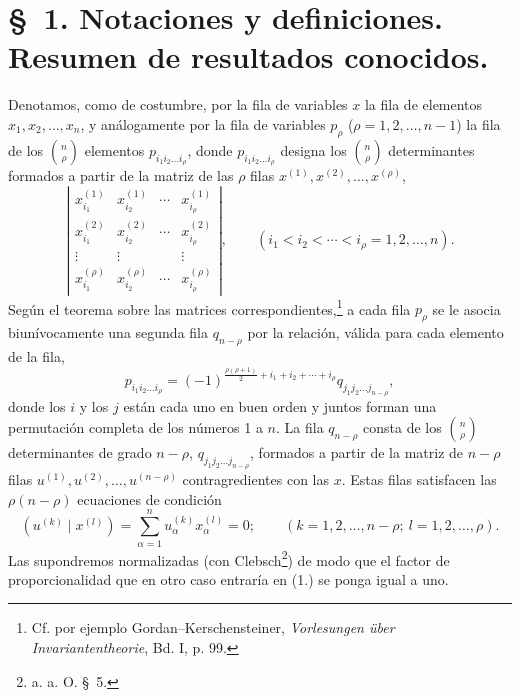 \documentclass[11pt]{article}
\begin{document}
\section*{\S\ 1. Notaciones y definiciones. Resumen de resultados conocidos.}
Denotamos, como de costumbre, por la fila de variables $x$ la fila de elementos $x_1,x_2,\ldots,x_n$, y análogamente por la fila de variables $p_\rho$ ($\rho=1,2,\ldots,n-1$) la fila de los $\binom n\rho$ elementos $p_{i_1i_2\ldots i_\rho}$, donde $p_{i_1i_2\ldots i_\rho}$ designa los $\binom n\rho$ determinantes formados a partir de la matriz de las $\rho$ filas $x^{(1)},x^{(2)},\ldots,x^{(\rho)}$,
\[
\left|\begin{array}{cccc}
 x_{i_1}^{(1)}&x_{i_2}^{(1)}&\cdots&x_{i_\rho}^{(1)}\\
 x_{i_1}^{(2)}&x_{i_2}^{(2)}&\cdots&x_{i_\rho}^{(2)}\\
 \vdots&\vdots&&\vdots\\
 x_{i_1}^{(\rho)}&x_{i_2}^{(\rho)}&\cdots&x_{i_\rho}^{(\rho)}
\end{array}\right|,
\qquad (i_1<i_2<\cdots<i_\rho=1,2,\ldots,n).
\]
Según el teorema sobre las matrices correspondientes,\footnote{Cf. por ejemplo Gordan--Kerschensteiner, \emph{Vorlesungen über Invariantentheorie}, Bd. I, p. 99.} a cada fila $p_\rho$ se le asocia biunívocamente una segunda fila $q_{n-\rho}$ por la relación, válida para cada elemento de la fila,
\begin{equation}
 p_{i_1i_2\ldots i_\rho}=(-1)^{\frac{\rho(\rho+1)}{2}+i_1+i_2+\cdots+i_\rho}q_{j_1j_2\ldots j_{n-\rho}},
\tag{1}
\end{equation}
donde los $i$ y los $j$ están cada uno en buen orden y juntos forman una permutación completa de los números 1 a $n$. La fila $q_{n-\rho}$ consta de los $\binom n\rho$ determinantes de grado $n-\rho$, $q_{j_1j_2\ldots j_{n-\rho}}$, formados a partir de la matriz de $n-\rho$ filas $u^{(1)},u^{(2)},\ldots,u^{(n-\rho)}$ contragredientes con las $x$. Estas filas satisfacen las $\rho(n-\rho)$ ecuaciones de condición
\begin{equation}
 (u^{(k)}\mid x^{(l)})=\sum_{\alpha=1}^{n}u_\alpha^{(k)}x_\alpha^{(l)}=0;
 \qquad (k=1,2,\ldots,n-\rho;\ l=1,2,\ldots,\rho).
\tag{2}
\end{equation}
Las supondremos normalizadas (con Clebsch\footnote{a. a. O. \S\ 5.}) de modo que el factor de proporcionalidad que en otro caso entraría en (1.) se ponga igual a uno.
\end{document}
